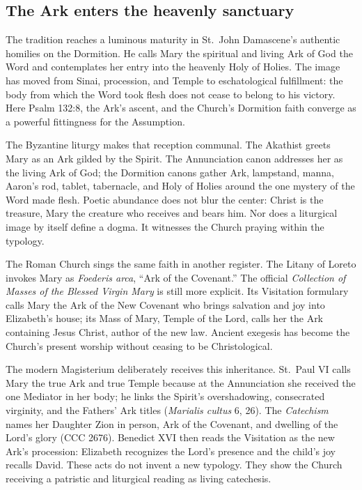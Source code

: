 \subsection{The Ark enters the heavenly sanctuary}

The tradition reaches a luminous maturity in St.~John Damascene's authentic
homilies on the Dormition. He calls Mary the spiritual and living Ark of God
the Word and contemplates her entry into the heavenly Holy of Holies. The image
has moved from Sinai, procession, and Temple to eschatological fulfillment:
the body from which the Word took flesh does not cease to belong to his victory.
Here Psalm 132:8, the Ark's ascent, and the Church's Dormition faith converge
as a powerful fittingness for the Assumption.

The Byzantine liturgy makes that reception communal. The Akathist greets Mary
as an Ark gilded by the Spirit. The Annunciation canon addresses her as the
living Ark of God; the Dormition canons gather Ark, lampstand, manna, Aaron's
rod, tablet, tabernacle, and Holy of Holies around the one mystery of the Word
made flesh. Poetic abundance does not blur the center: Christ is the treasure,
Mary the creature who receives and bears him. Nor does a liturgical image by
itself define a dogma. It witnesses the Church praying within the typology.

The Roman Church sings the same faith in another register. The Litany of Loreto
invokes Mary as \emph{Foederis arca}, ``Ark of the Covenant.'' The official
\emph{Collection of Masses of the Blessed Virgin Mary} is still more explicit.
Its Visitation formulary calls Mary the Ark of the New Covenant who brings
salvation and joy into Elizabeth's house; its Mass of Mary, Temple of the Lord,
calls her the Ark containing Jesus Christ, author of the new law. Ancient
exegesis has become the Church's present worship without ceasing to be
Christological.

The modern Magisterium deliberately receives this inheritance. St.~Paul VI
calls Mary the true Ark and true Temple because at the Annunciation she received
the one Mediator in her body; he links the Spirit's overshadowing, consecrated
virginity, and the Fathers' Ark titles (\emph{Marialis cultus} 6, 26). The
\emph{Catechism} names her Daughter Zion in person, Ark of the Covenant, and
dwelling of the Lord's glory (CCC 2676). Benedict XVI then reads the Visitation
as the new Ark's procession: Elizabeth recognizes the Lord's presence and the
child's joy recalls David. These acts do not invent a new typology. They show
the Church receiving a patristic and liturgical reading as living catechesis.

